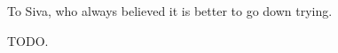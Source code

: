 %
%
%
%
%

\begin{dedication}
To Siva, who always believed it is better to go down trying.
\end{dedication}

\begin{acknowledgments}
  TODO.
\end{acknowledgments}

\tableofcontents

\listoftables

